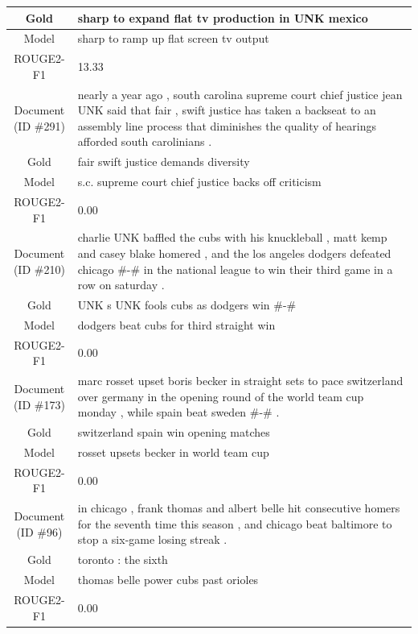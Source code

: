 \begin{table}[bth!]
\begin{tabular}{c|p{}}
\\ \hline
Gold & 
sharp to expand flat tv production in UNK mexico
\\ \hline
Model & 
sharp to ramp up flat screen tv output
\\ \hline
ROUGE2-F1 & 
13.33
\\ \hline
\makecell{Document\\(ID \#291)} & 
nearly a year ago , south carolina supreme court chief justice jean UNK said that fair , swift justice has taken a backseat to an assembly line process that diminishes the quality of hearings afforded south carolinians .
\\ \hline
Gold & 
fair swift justice demands diversity
\\ \hline
Model & 
s.c. supreme court chief justice backs off criticism
\\ \hline
ROUGE2-F1 & 
0.00
\\ \hline
\makecell{Document\\(ID \#210)} & 
charlie UNK baffled the cubs with his knuckleball , matt kemp and casey blake homered , and the los angeles dodgers defeated chicago \#-\# in the national league to win their third game in a row on saturday .
\\ \hline
Gold & 
UNK s UNK fools cubs as dodgers win \#-\#
\\ \hline
Model & 
dodgers beat cubs for third straight win
\\ \hline
ROUGE2-F1 & 
0.00
\\ \hline
\makecell{Document\\(ID \#173)} & 
marc rosset upset boris becker in straight sets to pace switzerland over germany in the opening round of the world team cup monday , while spain beat sweden \#-\# .
\\ \hline
Gold & 
switzerland spain win opening matches
\\ \hline
Model & 
rosset upsets becker in world team cup
\\ \hline
ROUGE2-F1 & 
0.00
\\ \hline
\makecell{Document\\(ID \#96)} & 
in chicago , frank thomas and albert belle hit consecutive homers for the seventh time this season , and chicago beat baltimore to stop a six-game losing streak .
\\ \hline
Gold & 
toronto : the sixth
\\ \hline
Model & 
thomas belle power cubs past orioles
\\ \hline
ROUGE2-F1 & 
0.00
\\ \hline

\end{tabular}
\end{table}
